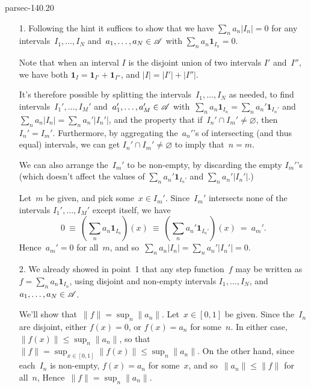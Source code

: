\documentclass[b5page]{book}
\begin{document}
\begin{solution}{parsec-140.20}
\begin{enumerate}
    \item[1.]
Following the hint
it suffices to show that
we have
$\sum_n a_n\left|I_n\right| = 0$
for any intervals~$I_1,\dotsc,I_N$ 
and~$a_1,\dotsc,a_N\in \mathscr{A}$
with $\sum_n a_n \mathbf{1}_{I_n}=0$.

Note that when an interval $I$ is the disjoint
union of two intervals $I'$ and~$I''$,
        we have both
        $\mathbf{1}_{I} = \mathbf{1}_{I'} + \mathbf{1}_{I''}$,
        and $\left|I\right| = \left|I'\right|+\left|I''\right|$.

It's therefore possible
by splitting the intervals~$I_1,\dotsc,I_N$ as needed,
        to find intervals~$I_1',\dotsc,I_M'$
    and~$a_1',\dotsc,a_M'\in\mathscr{A}$
with~$\sum_n a_n \mathbf{1}_{I_n}
= \sum_n a_n' \mathbf{1}_{I_n'}$
and~$\sum_n a_n\left|I_n\right|
= \sum_n a_n'\left|I_n'\right|$,
and the property
that if~$I_n'\cap I_m'\neq \varnothing$,
then~$I_n'=I_m'$.
    Furthermore, by aggregating the~$a_n'$'s of intersecting (and thus equal)
    intervals, we can get  $I_n'\cap I_m'\neq \varnothing$
        to imply that~$n=m$.

We can also arrange the~$I_m'$ to be non-empty, by discarding
        the empty $I_m'$'s (which
        doesn't affect the values of  $\sum_n a_n'\mathbf{1}_{I_n'}$
        and $\sum_n a_n'\left|I_n'\right|$.)

Let~$m$ be given,
        and pick some~$x\in I_m'$.
Since~$I_m'$ intersects none of the intervals $I_1',\dotsc,I_M'$
except itself, we have
\begin{equation*}
    \textstyle
    0\ \equiv\  (\sum_n a_n \mathbf{1}_{I_n})(x)
        \ \equiv\ 
        (\sum_n a_n' \mathbf{1}_{I_n'})(x) \ =\  a_m'.
\end{equation*}
Hence~$a_m'=0$ for all~$m$,
and so~$\sum_n a_n \left|I_n\right|
 = \sum_n a_n' \left|I_n'\right| = 0$.
\item[2.]
We already showed in point~1 that any step function~$f$
        may be written as 
        $f=\sum_n a_n \mathbf{1}_{I_n}$,
        using disjoint and non-empty intervals 
$I_1,\dotsc,I_N$, and~$a_1,\dotsc, a_N\in\mathscr{A}$.

We'll show that~$\|f\|=\sup_n\|a_n\|$.
Let~$x\in [0,1]$ be given.
Since the~$I_n$ are disjoint,
        either $f(x)=0$,
        or $f(x)=a_n$ for some~$n$.
In either case, $\|f(x)\|\leq \sup_n \|a_n\|$,
so that~$\|f\|=\sup_{x\in [0,1]}\|f(x)\|\leq \sup_n\|a_n\|$.
On the other hand,
since each~$I_n$ is non-empty,
$f(x)=a_n$ for some~$x$,
and so~$\|a_n\|\leq \|f\|$ for all~$n$,
Hence~$\|f\|=\sup_n \|a_n\|$.


\end{enumerate}
\end{solution}
\end{document}
